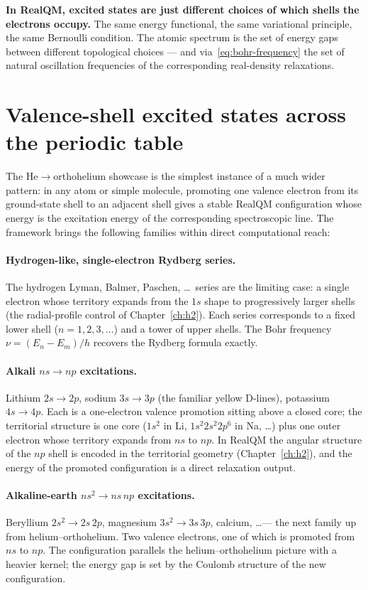 \textbf{In RealQM, excited states are just different choices of which shells the electrons occupy.} The same energy functional, the same variational principle, the same Bernoulli condition. The atomic spectrum is the set of energy gaps between different topological choices --- and via~\eqref{eq:bohr-frequency} the set of natural oscillation frequencies of the corresponding real-density relaxations.

\section{Valence-shell excited states across the periodic table}\label{sec:valence-excitations}

The He$\to$orthohelium showcase is the simplest instance of a much wider pattern: in any atom or simple molecule, promoting one valence electron from its ground-state shell to an adjacent shell gives a stable RealQM configuration whose energy is the excitation energy of the corresponding spectroscopic line. The framework brings the following families within direct computational reach:

\paragraph{Hydrogen-like, single-electron Rydberg series.}
The hydrogen Lyman, Balmer, Paschen, \ldots\ series are the limiting case: a single electron whose territory expands from the $1s$ shape to progressively larger shells (the radial-profile control of Chapter~\ref{ch:h2}). Each series corresponds to a fixed lower shell ($n=1, 2, 3, \ldots$) and a tower of upper shells. The Bohr frequency $\nu = (E_n - E_m)/h$ recovers the Rydberg formula exactly.

\paragraph{Alkali $ns \to np$ excitations.}
Lithium $2s \to 2p$, sodium $3s \to 3p$ (the familiar yellow D-lines), potassium $4s \to 4p$. Each is a one-electron valence promotion sitting above a closed core; the territorial structure is one core ($1s^2$ in Li, $1s^2 2s^2 2p^6$ in Na, \ldots) plus one outer electron whose territory expands from $ns$ to $np$. In RealQM the angular structure of the $np$ shell is encoded in the territorial geometry (Chapter~\ref{ch:h2}), and the energy of the promoted configuration is a direct relaxation output.

\paragraph{Alkaline-earth $ns^2 \to ns\,np$ excitations.}
Beryllium $2s^2 \to 2s\,2p$, magnesium $3s^2 \to 3s\,3p$, calcium, \ldots --- the next family up from helium--orthohelium. Two valence electrons, one of which is promoted from $ns$ to $np$. The configuration parallels the helium--orthohelium picture with a heavier kernel; the energy gap is set by the Coulomb structure of the new configuration.

